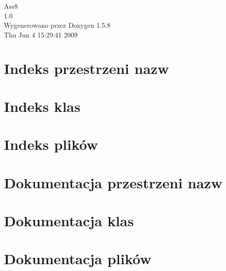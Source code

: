 \documentclass[a4paper]{book}
\begin{document}
\begin{titlepage}
\vspace*{7cm}
\begin{center}
{\Large Ass8 \\[1ex]\large 1.0 }\\
\vspace*{1cm}
{\large Wygenerowano przez Doxygen 1.5.8}\\
\vspace*{0.5cm}
{\small Thu Jun 4 15:29:41 2009}\\
\end{center}
\end{titlepage}
\clearemptydoublepage
{}
\tableofcontents
\clearemptydoublepage
{}
\chapter{Indeks przestrzeni nazw}

\chapter{Indeks klas}

\chapter{Indeks plików}

\chapter{Dokumentacja przestrzeni nazw}

\chapter{Dokumentacja klas}





\chapter{Dokumentacja plików}













\printindex
\end{document}
